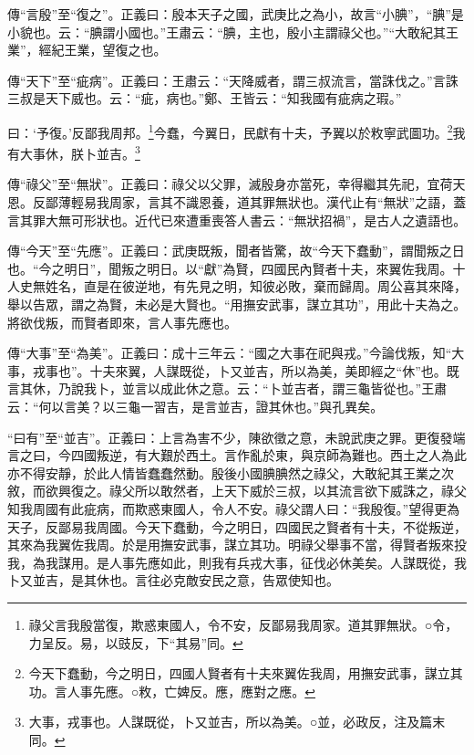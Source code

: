{\noindent\zhuan{}\fzbyks 傳“言殷”至“復之”。正義曰：殷本天子之國，武庚比之為小，故言“小腆”，“腆”是小貌也。云：“腆謂小國也。”王肅云：“腆，主也，殷小主謂祿父也。”“大敢紀其王業”，經紀王業，望復之也。 \par}

{\noindent\zhuan{}\fzbyks 傳“天下”至“疵病”。正義曰：王肅云：“天降威者，謂三叔流言，當誅伐之。”言誅三叔是天下威也。云：“疵，病也。”鄭、王皆云：“知我國有疵病之瑕。” \par}

曰：‘予復。’反鄙我周邦。\footnote{祿父言我殷當復，欺惑東國人，令不安，反鄙易我周家。道其罪無狀。○令，力呈反。易，以豉反，下“其易”同。}今蠢，今翼日，民獻有十夫，予翼以於敉寧武圖功。\footnote{今天下蠢動，今之明日，四國人賢者有十夫來翼佐我周，用撫安武事，謀立其功。言人事先應。○敉，亡婢反。應，應對之應。}我有大事休，朕卜並吉。\footnote{大事，戎事也。人謀既從，卜又並吉，所以為美。○並，必政反，注及篇末同。}

{\noindent\zhuan{}\fzbyks 傳“祿父”至“無狀”。正義曰：祿父以父罪，滅殷身亦當死，幸得繼其先祀，宜荷天恩。反鄙薄輕易我周家，言其不識恩養，道其罪無狀也。漢代止有“無狀”之語，蓋言其罪大無可形狀也。近代已來遭重喪答人書云：“無狀招禍”，是古人之遺語也。 \par}

{\noindent\zhuan{}\fzbyks 傳“今天”至“先應”。正義曰：武庚既叛，聞者皆驚，故“今天下蠢動”，謂聞叛之日也。“今之明日”，聞叛之明日。以“獻”為賢，四國民內賢者十夫，來翼佐我周。十人史無姓名，直是在彼逆地，有先見之明，知彼必敗，棄而歸周。周公喜其來降，舉以告眾，謂之為賢，未必是大賢也。“用撫安武事，謀立其功”，用此十夫為之。將欲伐叛，而賢者即來，言人事先應也。 \par}

{\noindent\zhuan{}\fzbyks 傳“大事”至“為美”。正義曰：成十三年云：“國之大事在祀與戎。”今論伐叛，知“大事，戎事也”。十夫來翼，人謀既從，卜又並吉，所以為美，美即經之“休”也。既言其休，乃說我卜，並言以成此休之意。云：“卜並吉者，謂三龜皆從也。”王肅云：“何以言美？以三龜一習吉，是言並吉，證其休也。”與孔異矣。 \par}

{\noindent\shu{}\fzkt “曰有”至“並吉”。正義曰：上言為害不少，陳欲徵之意，未說武庚之罪。更復發端言之曰，今四國叛逆，有大艱於西土。言作亂於東，與京師為難也。西土之人為此亦不得安靜，於此人情皆蠢蠢然動。殷後小國腆腆然之祿父，大敢紀其王業之次敘，而欲興復之。祿父所以敢然者，上天下威於三叔，以其流言欲下威誅之，祿父知我周國有此疵病，而欺惑東國人，令人不安。祿父謂人曰：“我殷復。”望得更為天子，反鄙易我周國。今天下蠢動，今之明日，四國民之賢者有十夫，不從叛逆，其來為我翼佐我周。於是用撫安武事，謀立其功。明祿父舉事不當，得賢者叛來投我，為我謀用。是人事先應如此，則我有兵戎大事，征伐必休美矣。人謀既從，我卜又並吉，是其休也。言往必克敵安民之意，告眾使知也。 \par}

